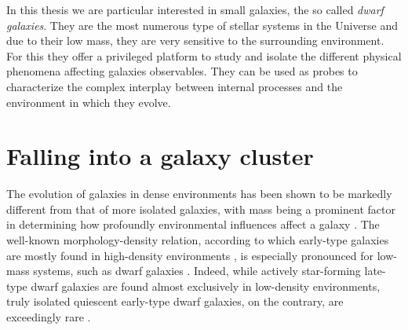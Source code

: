 In this thesis we are particular interested in small galaxies, the so called \emph{dwarf galaxies}.
They are the most numerous type of stellar systems in the Universe and due to their low mass, they are very sensitive to the surrounding environment.
For this they offer a privileged platform to study and isolate the different physical phenomena affecting galaxies observables.
They can be used as probes to characterize the complex interplay between internal processes and the environment in which they evolve.



\section{Falling into a galaxy cluster}

The evolution of galaxies in dense environments has been shown to be markedly different from that of more isolated galaxies, with mass being a prominent factor in determining how profoundly environmental influences affect a galaxy \citep{Boselli2006, Grossi2018a}.
The well-known morphology-density relation, according to which early-type galaxies are mostly found in high-density environments \citep{Dressler1980, Dressler1997}, is especially pronounced for low-mass systems, such as dwarf galaxies \citep{McConnachie2012}.
Indeed, while actively star-forming late-type dwarf galaxies are found almost exclusively in low-density environments, truly isolated quiescent early-type dwarf galaxies, on the contrary, are exceedingly rare \citep{Binggeli1990, Karachentseva2010, Geha2012}.

